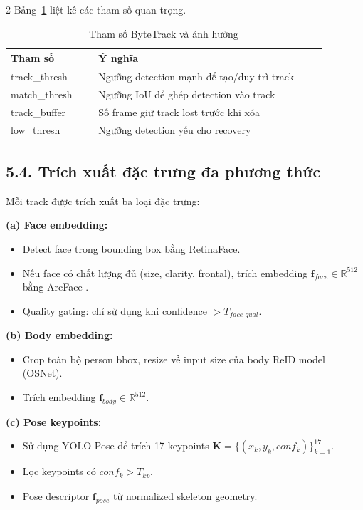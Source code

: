 \documentclass[a4paper,13pt]{article}
\begin{document}
\begin{multicols}{2}
Bảng~\ref{tab:bytetrack_params} liệt kê các tham số quan trọng.

\begin{table}[H]
\centering
\caption{Tham số ByteTrack và ảnh hưởng}
\label{tab:bytetrack_params}
\fontsize{10}{12}\selectfont
\renewcommand{\arraystretch}{1.2}
\begin{tabular}{p{0.25\linewidth}p{0.65\linewidth}}
\toprule
\textbf{Tham số} & \textbf{Ý nghĩa} \\
\midrule
track\_thresh & Ngưỡng detection mạnh để tạo/duy trì track \\
match\_thresh & Ngưỡng IoU để ghép detection vào track \\
track\_buffer & Số frame giữ track lost trước khi xóa \\
low\_thresh & Ngưỡng detection yếu cho recovery \\
\bottomrule
\end{tabular}
\end{table}

\subsection*{5.4. Trích xuất đặc trưng đa phương thức}
Mỗi track được trích xuất ba loại đặc trưng:

\textbf{(a) Face embedding:}
\begin{itemize}
    \item Detect face trong bounding box bằng RetinaFace.
    \item Nếu face có chất lượng đủ (size, clarity, frontal), trích embedding $\mathbf{f}_{face} \in \mathbb{R}^{512}$ bằng ArcFace \cite{deng2019arcface}.
    \item Quality gating: chỉ sử dụng khi confidence $> T_{face\_qual}$.
\end{itemize}

\textbf{(b) Body embedding:}
\begin{itemize}
    \item Crop toàn bộ person bbox, resize về input size của body ReID model (OSNet).
    \item Trích embedding $\mathbf{f}_{body} \in \mathbb{R}^{512}$.
\end{itemize}

\textbf{(c) Pose keypoints:}
\begin{itemize}
    \item Sử dụng YOLO Pose để trích 17 keypoints $\mathbf{K} = \{(x_k, y_k, conf_k)\}_{k=1}^{17}$.
    \item Lọc keypoints có $conf_k > T_{kp}$.
    \item Pose descriptor $\mathbf{f}_{pose}$ từ normalized skeleton geometry.
\end{itemize}


\end{multicols}
\end{document}
